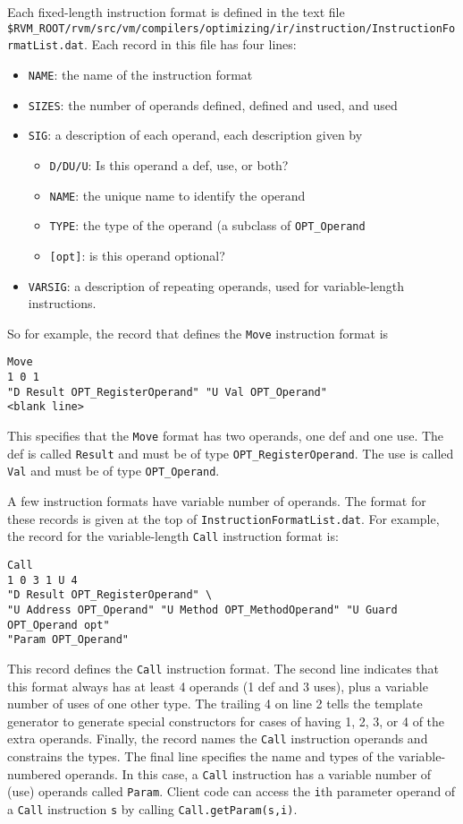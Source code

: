 Each fixed-length instruction format is defined in the text file 
{\tt \$RVM\_\-ROOT/\-rvm/\-src/\-vm/\-com\-pi\-lers/\-op\-ti\-mi\-zing/\-ir/\-in\-struction/InstructionFormatList.dat}.
Each record in this file has four lines:
\begin{itemize}
\item {\tt NAME}: the name of the instruction format
\item {\tt SIZES}: the number of operands defined, defined and used, and used 
\item {\tt SIG}: a description of each operand, each description given
by
\begin{itemize}
\item {\tt D/DU/U}: Is this operand a def, use, or both?
\item {\tt NAME}: the unique name to identify the operand
\item {\tt TYPE}: the type of the operand (a subclass of {\tt OPT\_Operand}
\item {\tt [opt]}: is this operand optional?
\end{itemize}
\item {\tt VARSIG}: a description of repeating operands, used for
variable-length instructions.
\end{itemize}

So for example, the record that defines the {\tt Move} instruction format
is
\begin{verbatim}
Move
1 0 1
"D Result OPT_RegisterOperand" "U Val OPT_Operand"
<blank line>
\end{verbatim}

This specifies that the {\tt Move} format has two operands, one def and one
use.  The def is called {\tt Result} and must be of
type {\tt OPT\_RegisterOperand}.
The use is called {\tt Val} and must be of type {\tt OPT\_Operand}.

A few instruction formats have variable number of operands.  The
format for these records is given at the top of {\tt InstructionFormatList.dat}.
For example, the record for the variable-length {\tt Call} instruction
format is: 
\begin{verbatim}
Call
1 0 3 1 U 4
"D Result OPT_RegisterOperand" \
"U Address OPT_Operand" "U Method OPT_MethodOperand" "U Guard OPT_Operand opt"
"Param OPT_Operand"
\end{verbatim}
This record defines the {\tt Call} instruction format.  The second line
indicates that this format always has at least 4 operands (1 def and 3 uses),
plus a variable number of uses of one other type.  The trailing
4 on line 2 tells the template generator to generate special constructors
for cases of having 1, 2, 3, or 4 of the extra operands.
Finally, the record names the {\tt Call} instruction operands and
constrains the types.  The final line specifies the name and
types of the variable-numbered operands.  In this case, a {\tt Call}
instruction has a variable number of (use) operands called {\tt Param}.
Client code can access the {\tt i}th parameter operand of a {\tt Call}
instruction {\tt s} by calling {\tt Call.getParam(s,i)}.

